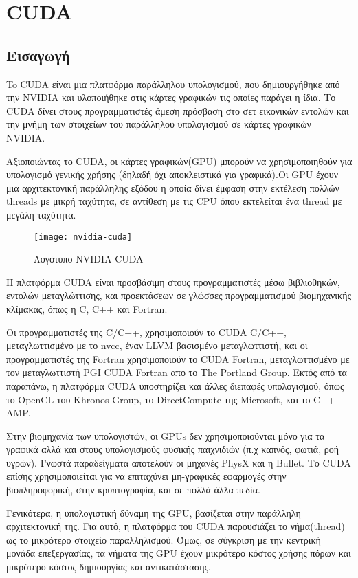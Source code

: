 \section{CUDA}
\subsection{Εισαγωγή}
To CUDA είναι μια πλατφόρμα παράλληλου υπολογισμού, που δημιουργήθηκε από την NVIDIA και υλοποιήθηκε στις κάρτες γραφικών τις οποίες παράγει η ίδια. Το CUDA δίνει στους προγραμματιστές άμεση πρόσβαση στο σετ εικονικών εντολών και την μνήμη των στοιχείων του παράλληλου υπολογισμού σε κάρτες γραφικών NVIDIA. 

Αξιοποιώντας το CUDA, οι κάρτες γραφικών(GPU) μπορούν να χρησιμοποιηθούν για υπολογισμό γενικής χρήσης (δηλαδή όχι αποκλειστικά για γραφικά).Οι GPU έχουν μια αρχιτεκτονική παράλληλης εξόδου η οποία δίνει έμφαση στην εκτέλεση πολλών threads με μικρή ταχύτητα, σε αντίθεση με τις CPU όπου εκτελείται ένα thread με μεγάλη ταχύτητα. 

\begin{figure}[h]
\centering
\texttt{[image: nvidia-cuda]}
\caption{Λογότυπο NVIDIA CUDA\cite{figure-3}}
\end{figure}

Η πλατφόρμα CUDA είναι προσβάσιμη στους προγραμματιστές μέσω βιβλιοθηκών, εντολών μεταγλώττισης, και προεκτάσεων σε γλώσσες προγραμματισμού βιομηχανικής κλίμακας, όπως η C, C++ και Fortran.

Οι προγραμματιστές της C/C++, χρησιμοποιούν το CUDA C/C++, μεταγλωττισμένο με το nvcc, έναν LLVM βασισμένο μεταγλωττιστή, και οι προγραμματιστές της Fortran χρησιμοποιούν το CUDA Fortran, μεταγλωττισμένο με τον μεταγλωττιστή PGI CUDA Fortran απο το The Portland Group. Εκτός από τα παραπάνω, η πλατφόρμα CUDA υποστηρίζει και άλλες διεπαφές υπολογισμού, όπως το OpenCL του Khronos Group, το DirectCompute της Microsoft, και το C++ AMP.

Στην βιομηχανία των υπολογιστών, οι GPUs δεν χρησιμοποιούνται μόνο για τα γραφικά αλλά και στους υπολογισμούς φυσικής παιχνιδιών (π.χ καπνός, φωτιά, ροή υγρών). Γνωστά παραδείγματα αποτελούν οι μηχανές PhysX και η Bullet. Το CUDA επίσης χρησιμοποιείται για να επιταχύνει μη-γραφικές εφαρμογές στην βιοπληροφορική, στην κρυπτογραφία, και σε πολλά άλλα πεδία.\cite{cuda-1}

Γενικότερα, η υπολογιστική δύναμη της GPU, βασίζεται στην παράλληλη αρχιτεκτονική της. Για αυτό, η πλατφόρμα του CUDA παρουσιάζει το νήμα(thread) ως το μικρότερο στοιχείο παραλληλισμού. Όμως, σε σύγκριση με την κεντρική μονάδα επεξεργασίας, τα νήματα της GPU έχουν μικρότερο κόστος χρήσης πόρων και μικρότερο κόστος δημιουργίας και αντικατάστασης.

